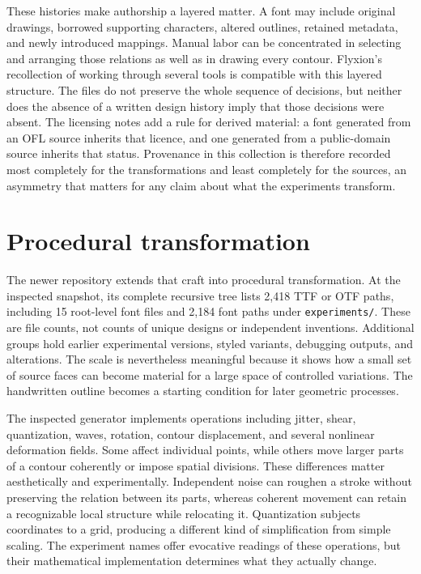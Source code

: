 \documentclass[11pt]{article}
\begin{document}
These histories make authorship a layered matter. A font may include original drawings, borrowed supporting characters, altered outlines, retained metadata, and newly introduced mappings. Manual labor can be concentrated in selecting and arranging those relations as well as in drawing every contour. Flyxion's recollection of working through several tools is compatible with this layered structure. The files do not preserve the whole sequence of decisions, but neither does the absence of a written design history imply that those decisions were absent. The licensing notes add a rule for derived material: a font generated from an OFL source inherits that licence, and one generated from a public-domain source inherits that status. Provenance in this collection is therefore recorded most completely for the transformations and least completely for the sources, an asymmetry that matters for any claim about what the experiments transform.

\section{Procedural transformation}

The newer repository extends that craft into procedural transformation. At the inspected snapshot, its complete recursive tree lists 2,418 TTF or OTF paths, including 15 root-level font files and 2,184 font paths under \texttt{experiments/}. These are file counts, not counts of unique designs or independent inventions. Additional groups hold earlier experimental versions, styled variants, debugging outputs, and alterations. The scale is nevertheless meaningful because it shows how a small set of source faces can become material for a large space of controlled variations. The handwritten outline becomes a starting condition for later geometric processes.

The inspected generator implements operations including jitter, shear, quantization, waves, rotation, contour displacement, and several nonlinear deformation fields. Some affect individual points, while others move larger parts of a contour coherently or impose spatial divisions. These differences matter aesthetically and experimentally. Independent noise can roughen a stroke without preserving the relation between its parts, whereas coherent movement can retain a recognizable local structure while relocating it. Quantization subjects coordinates to a grid, producing a different kind of simplification from simple scaling. The experiment names offer evocative readings of these operations, but their mathematical implementation determines what they actually change.
\end{document}
